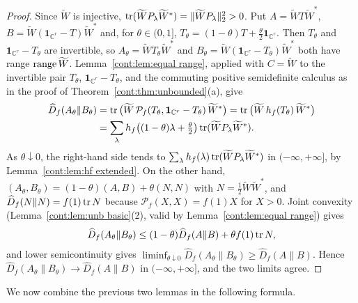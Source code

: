 \begin{proof}
Since $\widetilde{W}$ is injective, $\operatorname{tr}(\widetilde{W}P_\lambda \widetilde{W}^*)=\|\widetilde{W}P_\lambda\|_2^2>0$. Put $A=\widetilde{W}T\widetilde{W}^*$, $B=\widetilde{W}(\mathbf{1}_{\mathbb{C}^r}-T)\widetilde{W}^*$ and, for $\theta\in(0,1]$, $T_\theta=(1-\theta)T+\frac\theta2\mathbf{1}_{\mathbb{C}^r}$. Then $T_\theta$ and $\mathbf{1}_{\mathbb{C}^r}-T_\theta$ are invertible, so $A_\theta=\widetilde{W}T_\theta \widetilde{W}^*$ and $B_\theta=\widetilde{W}(\mathbf{1}_{\mathbb{C}^r}-T_\theta)\widetilde{W}^*$ both have range $\operatorname{range} \widetilde{W}$. Lemma~\ref{cont:lem:equal range}, applied with $C=\widetilde{W}$ to the invertible pair $T_\theta$, $\mathbf{1}_{\mathbb{C}^r}-T_\theta$, and the commuting positive semidefinite calculus as in the proof of Theorem~\ref{cont:thm:unbounded}(a), give
\begin{align*}%
\widehat{D}_f(A_\theta\|B_\theta)&=\tr\big(\widetilde{W}\,\mathcal{P}_f(T_\theta,\mathbf{1}_{\mathbb{C}^r}-T_\theta)\,\widetilde{W}^*\big)=\tr\big(\widetilde{W}\,h_f(T_\theta)\,\widetilde{W}^*\big)\\&=\sum_\lambda h_f\big((1-\theta)\lambda+\tfrac\theta2\big)\tr(\widetilde{W}P_\lambda \widetilde{W}^*).
\end{align*}
As $\theta\downarrow0$, the right-hand side tends to $\sum_\lambda h_f(\lambda)\operatorname{tr}(\widetilde{W}P_\lambda \widetilde{W}^*)$ in $(-\infty,+\infty]$, by Lemma~\ref{cont:lem:hf extended}. On the other hand, $(A_\theta,B_\theta)=(1-\theta)(A,B)+\theta(N,N)$ with $N=\frac12\widetilde{W}\widetilde{W}^*$, and $\widehat{D}_f(N\|N)=f(1)\operatorname{tr} N$ because $\mathcal{P}_f(X,X)=f(1)X$ for $X>0$. Joint convexity (Lemma~\ref{cont:lem:unb basic}(2), valid by Lemma~\ref{cont:lem:equal range}) gives
\[
\widehat{D}_f(A_\theta\|B_\theta)\leq(1-\theta)\widehat{D}_f(A\|B)+\theta f(1)\operatorname{tr} N,
\]
and lower semicontinuity gives $\liminf_{\theta\downarrow0}\widehat{D}_f(A_\theta\|B_\theta)\geq\widehat{D}_f(A\|B)$. Hence $\widehat{D}_f(A_\theta\|B_\theta)\to\widehat{D}_f(A\|B)$ in $(-\infty,+\infty]$, and the two limits agree.
\end{proof}
We now combine the previous two lemmas in the following formula. 
